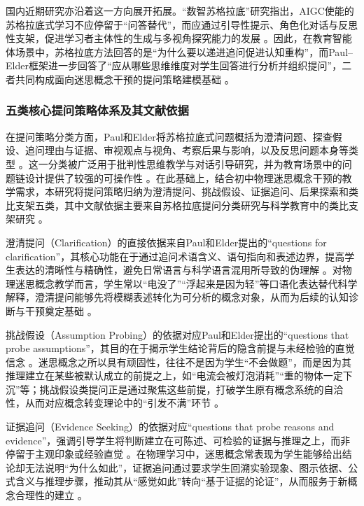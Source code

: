国内近期研究亦沿着这一方向展开拓展。“数智苏格拉底”研究指出，AIGC使能的苏格拉底式学习不应停留于“问答替代”，而应通过引导性提示、角色化对话与反思性支架，促进学习者主体性的生成与多视角探究能力的发展 \citep{zhao2024isocratic}。因此，在教育智能体场景中，苏格拉底方法回答的是“为什么要以递进追问促进认知重构”，而Paul--Elder框架进一步回答了“应从哪些思维维度对学生回答进行分析并组织提问”，二者共同构成面向迷思概念干预的提问策略建模基础 \citep{zhao2024isocratic,paul2007socratic,paul2010criticalthinking}。

\subsubsection{五类核心提问策略体系及其文献依据}
在提问策略分类方面，Paul和Elder将苏格拉底式问题概括为澄清问题、探查假设、追问理由与证据、审视观点与视角、考察后果与影响，以及反思问题本身等类型 \citep{paul2007socratic}。这一分类被广泛用于批判性思维教学与对话引导研究，并为教育场景中的问题链设计提供了较强的可操作性 \citep{paul2007socratic,paul2010criticalthinking}。在此基础上，结合初中物理迷思概念干预的教学需求，本研究将提问策略归纳为澄清提问、挑战假设、证据追问、后果探索和类比支架五类，其中文献依据主要来自苏格拉底提问分类研究与科学教育中的类比支架研究 \citep{paul2007socratic,podolefsky2007analogical}。

澄清提问（Clarification）的直接依据来自Paul和Elder提出的“questions for clarification”，其核心功能在于通过追问术语含义、语句指向和表述边界，提高学生表达的清晰性与精确性，避免日常语言与科学语言混用所导致的伪理解 \citep{paul2007socratic,paul2010criticalthinking}。对物理迷思概念教学而言，学生常以“电没了”“浮起来是因为轻”等口语化表达替代科学解释，澄清提问能够先将模糊表述转化为可分析的概念对象，从而为后续的认知诊断与干预奠定基础 \citep{paul2007socratic,aryani2024conceptualchange}。

挑战假设（Assumption Probing）的依据对应Paul和Elder提出的“questions that probe assumptions”，其目的在于揭示学生结论背后的隐含前提与未经检验的直觉信念 \citep{paul2007socratic,paul2010criticalthinking}。迷思概念之所以具有顽固性，往往不是因为学生“不会做题”，而是因为其推理建立在某些被默认成立的前提之上，如“电流会被灯泡消耗”“重的物体一定下沉”等；挑战假设类提问正是通过聚焦这些前提，打破学生原有概念系统的自洽性，从而对应概念转变理论中的“引发不满”环节 \citep{ref9,ref36,fan2024coexistence}。

证据追问（Evidence Seeking）的依据对应“questions that probe reasons and evidence”，强调引导学生将判断建立在可陈述、可检验的证据与推理之上，而非停留于主观印象或经验直觉 \citep{paul2007socratic,paul2010criticalthinking}。在物理学习中，迷思概念常表现为学生能够给出结论却无法说明“为什么如此”，证据追问通过要求学生回溯实验现象、图示依据、公式含义与推理步骤，推动其从“感觉如此”转向“基于证据的论证”，从而服务于新概念合理性的建立 \citep{majidy2025misconceptions,olaogun2025predictors}。

